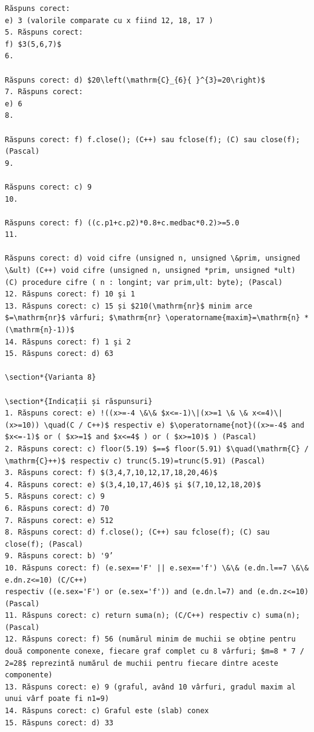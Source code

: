 \documentclass[10pt]{article}
\begin{document}
\begin{verbatim}
Răspuns corect:
e) 3 (valorile comparate cu x fiind 12, 18, 17 )
5. Răspuns corect:
f) $3(5,6,7)$
6.

Răspuns corect: d) $20\left(\mathrm{C}_{6}{ }^{3}=20\right)$
7. Răspuns corect:
e) 6
8.

Răspuns corect: f) f.close(); (C++) sau fclose(f); (C) sau close(f); (Pascal)
9.

Răspuns corect: c) 9
10.

Răspuns corect: f) ((c.p1+c.p2)*0.8+c.medbac*0.2)>=5.0
11.

Răspuns corect: d) void cifre (unsigned n, unsigned \&prim, unsigned \&ult) (C++) void cifre (unsigned n, unsigned *prim, unsigned *ult) (C) procedure cifre ( n : longint; var prim,ult: byte); (Pascal)
12. Răspuns corect: f) 10 şi 1
13. Răspuns corect: c) 15 și $210(\mathrm{nr}$ minim arce $=\mathrm{nr}$ vârfuri; $\mathrm{nr} \operatorname{maxim}=\mathrm{n} *(\mathrm{n}-1))$
14. Răspuns corect: f) 1 şi 2
15. Răspuns corect: d) 63

\section*{Varianta 8}

\section*{Indicații și răspunsuri}
1. Răspuns corect: e) !((x>=-4 \&\& $x<=-1)\|(x>=1 \& \& x<=4)\|(x>=10)) \quad(C / C++)$ respectiv e) $\operatorname{not}((x>=-4$ and $x<=-1)$ or ( $x>=1$ and $x<=4$ ) or ( $x>=10)$ ) (Pascal)
2. Răspuns corect: c) floor(5.19) $==$ floor(5.91) $\quad(\mathrm{C} / \mathrm{C}++)$ respectiv c) trunc(5.19)=trunc(5.91) (Pascal)
3. Răspuns corect: f) $(3,4,7,10,12,17,18,20,46)$
4. Răspuns corect: e) $(3,4,10,17,46)$ şi $(7,10,12,18,20)$
5. Răspuns corect: c) 9
6. Răspuns corect: d) 70
7. Răspuns corect: e) 512
8. Răspuns corect: d) f.close(); (C++) sau fclose(f); (C) sau close(f); (Pascal)
9. Răspuns corect: b) '9’
10. Răspuns corect: f) (e.sex=='F' || e.sex=='f') \&\& (e.dn.l==7 \&\& e.dn.z<=10) (C/C++)
respectiv ((e.sex='F') or (e.sex='f')) and (e.dn.l=7) and (e.dn.z<=10) (Pascal)
11. Răspuns corect: c) return suma(n); (C/C++) respectiv c) suma(n); (Pascal)
12. Răspuns corect: f) 56 (numărul minim de muchii se obține pentru două componente conexe, fiecare graf complet cu 8 vârfuri; $m=8 * 7 / 2=28$ reprezintă numărul de muchii pentru fiecare dintre aceste componente)
13. Răspuns corect: e) 9 (graful, având 10 vârfuri, gradul maxim al unui vârf poate fi n1=9)
14. Răspuns corect: c) Graful este (slab) conex
15. Răspuns corect: d) 33


\end{verbatim}
\end{document}
